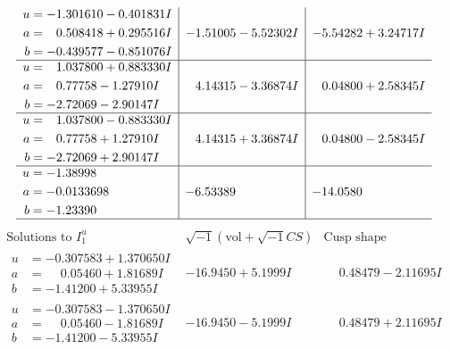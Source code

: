 \documentclass[1p]{elsarticle_modified}
\theoremstyle{definition}
\newcommand{\I}{\sqrt{-1}}
\begin{document}
$$\begin{array}{c|c|c}
\begin{aligned}
u &= -1.301610 - 0.401831 I \\
a &= \phantom{-}0.508418 + 0.295516 I \\
b &= -0.439577 - 0.851076 I\end{aligned}
 & -1.51005 - 5.52302 I & -5.54282 + 3.24717 I \\ \hline\begin{aligned}
u &= \phantom{-}1.037800 + 0.883330 I \\
a &= \phantom{-}0.77758 - 1.27910 I \\
b &= -2.72069 - 2.90147 I\end{aligned}
 & \phantom{-}4.14315 - 3.36874 I & \phantom{-}0.04800 + 2.58345 I \\ \hline\begin{aligned}
u &= \phantom{-}1.037800 - 0.883330 I \\
a &= \phantom{-}0.77758 + 1.27910 I \\
b &= -2.72069 + 2.90147 I\end{aligned}
 & \phantom{-}4.14315 + 3.36874 I & \phantom{-}0.04800 - 2.58345 I \\ \hline\begin{aligned}
u &= -1.38998\phantom{ +0.000000I} \\
a &= -0.0133698\phantom{ +0.000000I} \\
b &= -1.23390\phantom{ +0.000000I}\end{aligned}
 & -6.53389\phantom{ +0.000000I} & -14.0580\phantom{ +0.000000I}\\
 \hline 
 \end{array}$$\newpage$$\begin{array}{c|c|c}  
\text{Solutions to }I^u_{1}& \I (\text{vol} + \sqrt{-1}CS) & \text{Cusp shape}\\
 \hline 
\begin{aligned}
u &= -0.307583 + 1.370650 I \\
a &= \phantom{-}0.05460 + 1.81689 I \\
b &= -1.41200 + 5.33955 I\end{aligned}
 & -16.9450 + 5.1999 I & \phantom{-}0.48479 - 2.11695 I \\ \hline\begin{aligned}
u &= -0.307583 - 1.370650 I \\
a &= \phantom{-}0.05460 - 1.81689 I \\
b &= -1.41200 - 5.33955 I\end{aligned}
 & -16.9450 - 5.1999 I & \phantom{-}0.48479 + 2.11695 I \\ \hline\begin{aligned}

\end{aligned}
\end{array}$$
\end{document}

